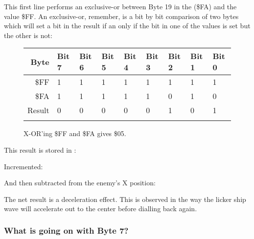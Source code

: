 This first line  performs an exclusive-or between Byte 19 in the  (\$FA) and the value \$FF. An exclusive-or,
remember, is a bit by bit comparison of two bytes which will set a bit in the result if an only if the bit in one of the
values is set but the other is not:

\begin{figure}[H]
  {
    \setlength{\tabcolsep}{3.0pt}
    \setlength\cmidrulewidth{\heavyrulewidth} %
    \begin{adjustbox}{width=10cm,center}

      \begin{tabular}{rllllllll}
        \toprule
        Byte & Bit 7 & Bit 6 & Bit 5 & Bit 4 & Bit 3 & Bit 2 & Bit 1 & Bit 0        \\
        \midrule
        \$FF & 1 & 1 & 1 & 1 & 1 & 1 & 1 & 1 \\
        \$FA & 1 & 1 & 1 & 1 & 1 & 0 & 1 & 0 \\
        \midrule
        Result & 0 & 0 & 0 & 0 & 0 & 1 & 0 & 1 \\
        \addlinespace
        \bottomrule
      \end{tabular}

    \end{adjustbox}

    }\caption*{X-OR'ing \$FF and \$FA gives \$05.}
\end{figure}

This result is stored in :
%


Incremented:
%


And then subtracted from the enemy's X position:
%


The net result is a deceleration effect. This is observed in the way the licker ship
wave will accelerate out to the center before dialling back again.


\subsubsection{What is going on with Byte 7?}

